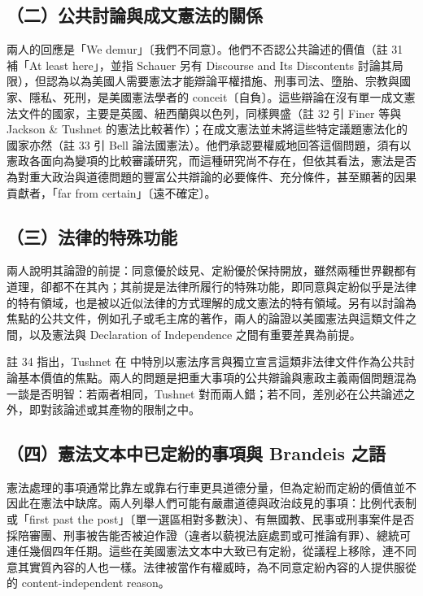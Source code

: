 \subsection{（二）公共討論與成文憲法的關係}

兩人的回應是「We demur」〔我們不同意〕。他們不否認公共論述的價值（註 31 補「At least here」，並指 Schauer 另有 Discourse and Its Discontents 討論其局限），但認為以為美國人需要憲法才能辯論平權措施、刑事司法、墮胎、宗教與國家、隱私、死刑，是美國憲法學者的 conceit〔自負〕。這些辯論在沒有單一成文憲法文件的國家，主要是英國、紐西蘭與以色列，同樣興盛（註 32 引 Finer 等與 Jackson \& Tushnet 的憲法比較著作）；在成文憲法並未將這些特定議題憲法化的國家亦然（註 33 引 Bell 論法國憲法）。他們承認要權威地回答這個問題，須有以憲政各面向為變項的比較審議研究，而這種研究尚不存在，但依其看法，憲法是否為對重大政治與道德問題的豐富公共辯論的必要條件、充分條件，甚至顯著的因果貢獻者，「far from certain」〔遠不確定〕。

\subsection{（三）法律的特殊功能}

兩人說明其論證的前提：同意優於歧見、定紛優於保持開放，雖然兩種世界觀都有道理，卻都不在其內；其前提是法律所履行的特殊功能，即同意與定紛似乎是法律的特有領域，也是被以近似法律的方式理解的成文憲法的特有領域。另有以討論為焦點的公共文件，例如孔子或毛主席的著作，兩人的論證以美國憲法與這類文件之間，以及憲法與 Declaration of Independence 之間有重要差異為前提。

註 34 指出，Tushnet 在  中特別以憲法序言與獨立宣言這類非法律文件作為公共討論基本價值的焦點。兩人的問題是把重大事項的公共辯論與憲政主義兩個問題混為一談是否明智：若兩者相同，Tushnet 對而兩人錯；若不同，差別必在公共論述之外，即對該論述或其產物的限制之中。

\subsection{（四）憲法文本中已定紛的事項與 Brandeis 之語}

憲法處理的事項通常比靠左或靠右行車更具道德分量，但為定紛而定紛的價值並不因此在憲法中缺席。兩人列舉人們可能有嚴肅道德與政治歧見的事項：比例代表制或「first past the post」〔單一選區相對多數決〕、有無國教、民事或刑事案件是否採陪審團、刑事被告能否被迫作證（違者以藐視法庭處罰或可推論有罪）、總統可連任幾個四年任期。這些在美國憲法文本中大致已有定紛，從議程上移除，連不同意其實質內容的人也一樣。法律被當作有權威時，為不同意定紛內容的人提供服從的 content-independent reason。

